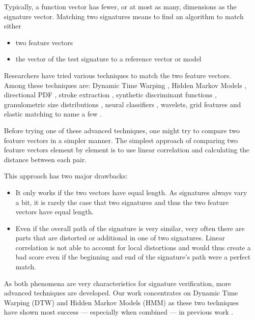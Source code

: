 \documentclass[a4paper, oneside]{csthesis}
\begin{document}
Typically, a function vector has fewer, or at most as many, dimensions as the signature vector. Matching two signatures means to find an algorithm to match either
\begin{itemize}
\item two feature vectors
\item the vector of the test signature to a reference vector or model
\end{itemize}

Researchers have tried various techniques to match the two feature vectors. Among these techniques are: Dynamic Time Warping \cite{Herbst98onan, citeulike:891512}, Hidden Markov Models \cite{Justino00anoff-line}, directional PDF \cite{drouhard_1996_pr}, stroke extraction \cite{1047809}, synthetic discriminant functions \cite{Wilkinson:91}, granulometric size distributions \cite{615447}, neural classifiers \cite{Bajaj19971}, wavelets\cite{Ramesh1999217}, grid features\cite{Qi19941621} and elastic matching\cite{citeulike:941886} to name a few \cite{PiyushShanker:2007:OSV:1274199.1274423}.


Before trying one of these advanced techniques, one might try to compare two feature vectors in a simpler manner.
The simplest approach of comparing two feature vectors element by element is to use linear correlation \cite{Plamondon1989107} and calculating the distance between each pair.

This approach has two major drawbacks:
\begin{itemize}
\item It only works if the two vectors have equal length. As signatures always vary a bit, it is rarely the case that two signatures and thus the two feature vectors have equal length.
\item Even if the overall path of the signature is very similar, very often there are parts that are distorted or additional in one of two signatures. Linear correlation is not able to account for local distortions and would thus create a bad score even if the beginning and end of the signature's path were a perfect match.
\end{itemize}

As both phenomena are very characteristics for signature verification, more advanced techniques are developed. Our work concentrates on Dynamic Time Warping (DTW) and Hidden Markov Models (HMM) as these two techniques have shown most success --- especially when combined --- in previous work \cite{fierrez2005line, citeulike:885135, kashi1998hidden, PiyushShanker:2007:OSV:1274199.1274423,martens1996line}.
\end{document}
